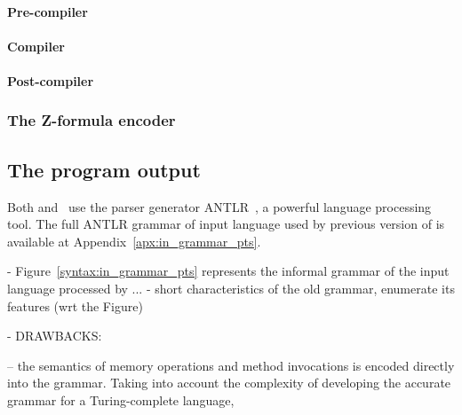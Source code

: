 \paragraph{Pre-compiler}
\label{ch:impl:proc:x-compiler:pre}

\paragraph{Compiler}
\label{ch:impl:proc:x-compiler:comp}

\paragraph{Post-compiler}
\label{ch:impl:proc:x-compiler:post}

\subsubsection{The Z-formula encoder}
\label{ch:impl:proc:z-encoder}

\subsection{The program output}
\label{ch:impl:out}


Both \porthos{} and \porthos[2] \ use the parser generator ANTLR~\cite{parr2013definitive}, a powerful language processing tool.
The full ANTLR grammar of input language used by previous version of \porthos{} is available at Appendix~\ref{apx:in_grammar_pts}.


- Figure~\ref{syntax:in_grammar_pts} represents the informal grammar of the input language processed by \porthos[1] ... %
- short characteristics of the old grammar, enumerate its features (wrt the Figure)

- DRAWBACKS: %

    -- the semantics of memory operations and method invocations is encoded directly into the grammar.
    Taking into account the complexity of developing the accurate grammar for a Turing-complete language,

